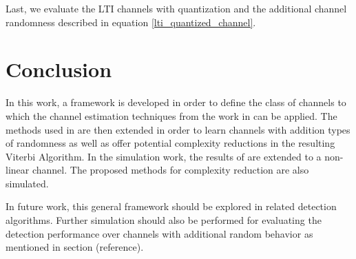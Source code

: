 \par
Last, we evaluate the LTI channels with quantization and the additional channel randomness described in equation \eqref{lti_quantized_channel}. 


\section{Conclusion}
In this work, a framework is developed in order to define the class of channels to which the channel estimation techniques from the work in\cite{shlezinger2019viterbinet} can be applied. The methods used in \cite{shlezinger2019viterbinet} are then extended in order to learn channels with addition types of randomness as well as offer potential complexity reductions in the resulting Viterbi Algorithm. 
 In the simulation work, the results of \cite{shlezinger2019viterbinet} are extended to a non-linear channel. The proposed methods for complexity reduction are also simulated.
 \par 
 In future work, this general framework should be explored in related detection algorithms. Further simulation should also be performed for evaluating the detection performance over channels with additional random behavior as mentioned in section (reference). 

